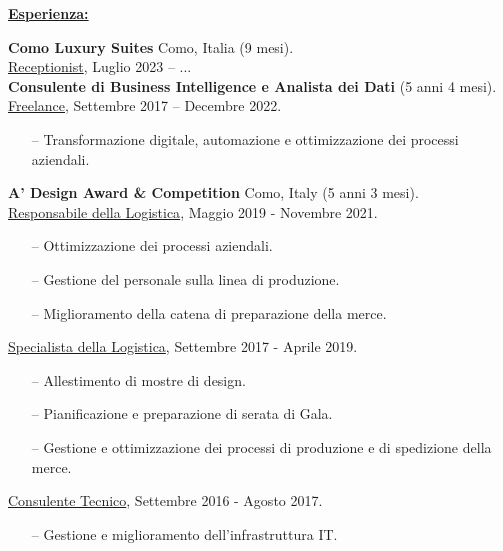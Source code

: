 \documentclass[a4paper,10pt,fullpage]{article}
\begin{document}
\begin{center}
	\underline{\textbf{\large Esperienza:}}
\end{center}	

\textbf{Como Luxury Suites} Como, Italia (9 mesi).\\
\underline{Receptionist}, Luglio 2023 – ...\\

\textbf{Consulente di Business Intelligence e Analista dei Dati} (5 anni 4 mesi).\\
\underline{Freelance}, Settembre 2017 – Decembre 2022.
\begin{itemize}
	\item[--] Transformazione digitale, automazione e ottimizzazione dei processi aziendali.\\
\end{itemize}


\textbf{A' Design Award \& Competition} Como, Italy (5 anni 3 mesi).\\
\underline{Responsabile della Logistica}, Maggio 2019 - Novembre 2021.
\begin{itemize}
	\item[--] Ottimizzazione dei processi aziendali.	
	\item[--] Gestione del personale sulla linea di produzione.
	\item[--] Miglioramento della catena di preparazione della merce.
\end{itemize}
\underline{Specialista della Logistica}, Settembre 2017 - Aprile 2019.
\begin{itemize}
	\item[--] Allestimento di mostre di design.
	\item[--] Pianificazione e preparazione di serata di Gala.
	\item[--] Gestione e ottimizzazione dei processi di produzione e di spedizione della merce.
\end{itemize}
\underline{Consulente Tecnico}, Settembre 2016 - Agosto 2017.
\begin{itemize}
	\item[--] Gestione e miglioramento dell'infrastruttura IT.\\
\end{itemize}
\end{document}
